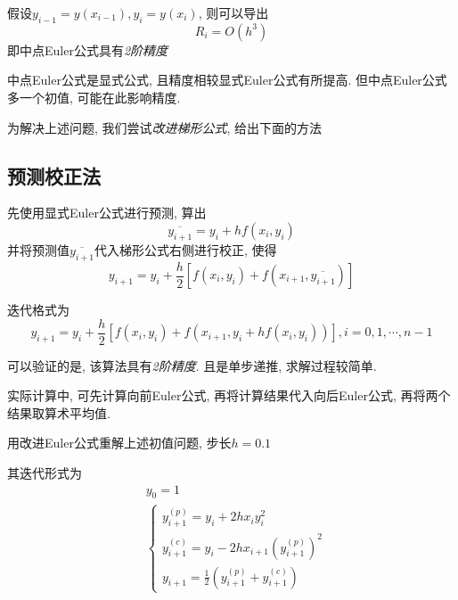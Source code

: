 假设$y_{i-1}=y(x_{i-1}), y_i=y(x_i)$, 则可以导出
\begin{equation*}
    R_i=O(h^3)
\end{equation*}
即中点Euler公式具有\emph{2阶精度}

\begin{notice}
    中点Euler公式是显式公式, 且精度相较显式Euler公式有所提高. 但中点Euler公式多一个初值, 可能在此影响精度.
\end{notice}

为解决上述问题, 我们尝试\emph{改进梯形公式}, 给出下面的方法

\subsection{预测校正法}

先使用显式Euler公式进行预测, 算出
\begin{equation*}
    \overline{y_{i+1}}=y_i+hf(x_i,y_i)
\end{equation*}
并将预测值$\overline{y_{i+1}}$代入梯形公式右侧进行校正, 使得
\begin{equation*}
    y_{i+1}=y_i+\frac{h}{2}\left[f(x_i,y_i)+f\left(x_{i+1},\overline{y_{i+1}}\right)\right]
\end{equation*}

迭代格式为
\begin{equation*}
    y_{i+1}=y_i+\frac{h}{2}\left[f(x_i,y_i)+f(x_{i+1},y_i+hf(x_i,y_i))\right], i=0,1,\cdots,n-1
\end{equation*}

可以验证的是, 该算法具有\emph{2阶精度}. 且是单步递推, 求解过程较简单.

\begin{notice}
    实际计算中, 可先计算向前Euler公式, 再将计算结果代入向后Euler公式, 再将两个结果取算术平均值.
\end{notice}

\begin{example}
    用改进Euler公式重解上述初值问题, 步长$h=0.1$
\end{example}

\begin{solution}
    其迭代形式为
    \begin{align*}
        &y_0=1\\
        &\begin{cases}
            y_{i+1}^{(p)}=y_i+2hx_iy_i^2\\
            y_{i+1}^{(c)}=y_i-2hx_{i+1}(y_{i+1}^{(p)})^2\\
            y_{i+1}=\frac{1}{2}\left(y_{i+1}^{(p)}+y_{i+1}^{(c)}\right)
        \end{cases}
    \end{align*}
\end{solution}

